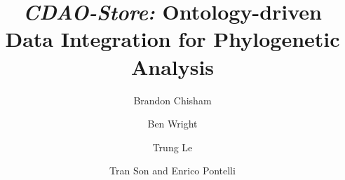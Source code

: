 \documentclass[10pt]{bmc_article}
\newenvironment{bmcformat}{\fussy\setboolean{publ}{true}}{\fussy}
\begin{document}
\begin{bmcformat}



\title{\emph{CDAO-Store:} Ontology-driven Data Integration for Phylogenetic Analysis}

 


\author{Brandon Chisham\correspondingauthor%
      \and
               Ben Wright \correspondingauthor%
	\and
         Trung Le%
    \and
	Tran Son %
       and 
	Enrico Pontelli%
      }
      


\address{%
    Department of Computer Science, New Mexico State University, Las Cruces, New Mexico, USA
}%

\maketitle




\end{bmcformat}
\end{document}
